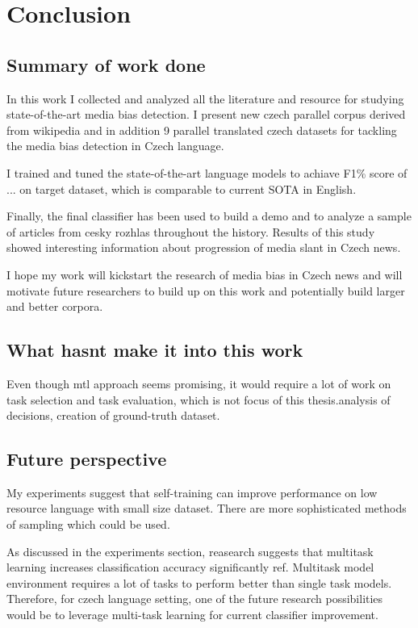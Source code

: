 \chapter{Conclusion}
\section{Summary of work done}
In this work I collected and analyzed all the literature and resource for studying state-of-the-art media bias detection. I present new czech parallel corpus derived from wikipedia and in addition 9 parallel translated czech datasets for tackling the media bias detection in Czech language.

I trained and tuned the state-of-the-art language models to achiave F1\% score of ... on target dataset, which is comparable to current SOTA in English.

Finally, the final classifier has been used to build a demo and to analyze a sample of articles from cesky rozhlas throughout the history. Results of this study showed interesting information about progression of media slant in Czech news.

I hope my work will kickstart the research of media bias in Czech news and will motivate future researchers to build up on this work and potentially build larger and better corpora.

\section{What hasnt make it into this work}
Even though \Gls{mtl} approach seems promising, it would require a lot of work on task selection and task evaluation, which is not focus of this thesis.analysis of decisions, creation of ground-truth dataset. 

\section{Future perspective}
My experiments suggest that self-training can improve performance on low resource language with small size dataset. There are more sophisticated methods of sampling which could be used.

As discussed in the experiments section, reasearch suggests that multitask learning increases classification accuracy significantly ref. Multitask model environment requires a lot of tasks \cite{aribandi2021ext5} to perform better than single task models. Therefore, for czech language setting, one of the future research possibilities would be to leverage multi-task learning for current classifier improvement. 